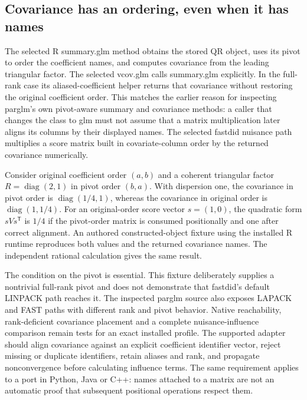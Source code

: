 \subsection{Covariance has an ordering, even when it has names}

The selected R summary.glm method obtains the stored QR object, uses its pivot to order the coefficient names, and computes covariance from the leading triangular factor. The selected vcov.glm calls summary.glm explicitly. In the full-rank case its aliased-coefficient helper returns that covariance without restoring the original coefficient order. This matches the earlier reason for inspecting parglm's own pivot-aware summary and covariance methods: a caller that changes the class to glm must not assume that a matrix multiplication later aligns its columns by their displayed names. The selected fastdid nuisance path multiplies a score matrix built in covariate-column order by the returned covariance numerically.\citep{exec28_panel_estimator_sources,exec29_panel_inference_sources,exec29_panel_runtime_sources}

Consider original coefficient order $(a,b)$ and a coherent triangular factor $R=\operatorname{diag}(2,1)$ in pivot order $(b,a)$. With dispersion one, the covariance in pivot order is $\operatorname{diag}(1/4,1)$, whereas the covariance in original order is $\operatorname{diag}(1,1/4)$. For an original-order score vector $s=(1,0)$, the quadratic form $sVs^{\mathsf T}$ is $1/4$ if the pivot-order matrix is consumed positionally and one after correct alignment. An authored constructed-object fixture using the installed R runtime reproduces both values and the returned covariance names. The independent rational calculation gives the same result.\citep{exec29_panel_runtime_reference}

The condition on the pivot is essential. This fixture deliberately supplies a nontrivial full-rank pivot and does not demonstrate that fastdid's default LINPACK path reaches it. The inspected parglm source also exposes LAPACK and FAST paths with different rank and pivot behavior. Native reachability, rank-deficient covariance placement and a complete nuisance-influence comparison remain tests for an exact installed profile. The supported adapter should align covariance against an explicit coefficient identifier vector, reject missing or duplicate identifiers, retain aliases and rank, and propagate nonconvergence before calculating influence terms. The same requirement applies to a port in Python, Java or C++: names attached to a matrix are not an automatic proof that subsequent positional operations respect them.\citep{exec29_panel_inference_sources,exec29_panel_runtime_sources,exec29_panel_runtime_reference}

